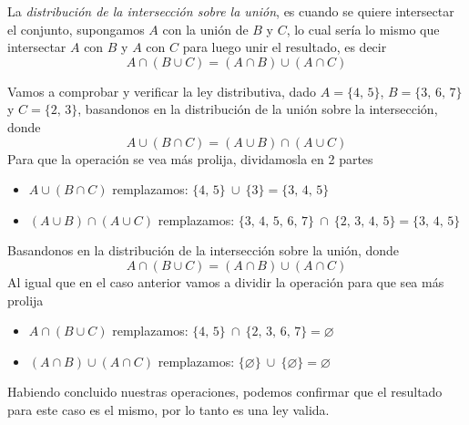 La \textit{distribución de la intersección sobre la unión}, es cuando se quiere intersectar el conjunto, supongamos \(A\) con la unión de \(B\) 
y \(C\), lo cual sería lo mismo que intersectar \(A\) con \(B\) y \(A\) con \(C\) para luego unir el resultado, es decir
\[
A \cap (B \cup C) = (A \cap B) \cup (A \cap C)
\]

Vamos a comprobar y verificar la ley distributiva, dado \(A = \{4 ,\,  5 \}\), \(B = \{3 ,\,  6 ,\, 7\}\) y 
\(C = \{2 ,\,  3 \}\), basandonos en la distribución de la unión sobre la intersección, donde 
\[
A \cup (B \cap C) = (A \cup B) \cap (A \cup C)
\]
Para que la operación se vea más prolija, dividamosla en 2 partes 
\begin{itemize}
    \item \(A \cup (B \cap C)\) remplazamos: \(\{4 ,\,  5 \} ~\cup~ \{3\} = \{3 ,\,  4 ,\, 5\}\) 
    \item \((A \cup B) \cap (A \cup C)\) remplazamos: \(\{3 ,\,  4 ,\, 5 ,\,  6 ,\,  7 \} ~\cap~ \{2 ,\,  3 ,\, 4 ,\,  5\} = 
    \{3 ,\,  4 ,\, 5\} \)
\end{itemize}

Basandonos en la distribución de la intersección sobre la unión, donde
\[
A \cap (B \cup C) = (A \cap B) \cup (A \cap C)
\]
Al igual que en el caso anterior vamos a dividir la operación para que sea más prolija
\begin{itemize}
    \item \(A \cap (B \cup C)\) remplazamos: \(\{4 ,\,  5 \} ~\cap~ \{2 ,\,  3 ,\,  6 ,\, 7\} = \varnothing\) 
    \item \((A \cap B) \cup (A \cap C)\) remplazamos: \(\{\varnothing\} ~\cup~ \{\varnothing\} = \varnothing\)
\end{itemize}

Habiendo concluido nuestras operaciones, podemos confirmar que el resultado para este caso es el mismo, por lo tanto es una ley valida.



